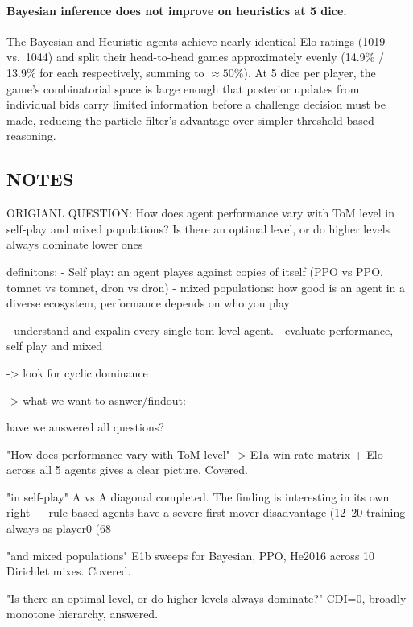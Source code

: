 \documentclass{article}
\begin{document}
  \paragraph{Bayesian inference does not improve on heuristics at 5 dice.}
  The Bayesian and Heuristic agents achieve nearly identical Elo ratings (1019
  vs.\ 1044) and split their head-to-head games approximately evenly (14.9\% /
  13.9\% for each respectively, summing to $\approx 50\%$). At 5 dice per player,
  the game's combinatorial space is large enough that posterior updates from
  individual bids carry limited information before a challenge decision must be
  made, reducing the particle filter's advantage over simpler threshold-based
  reasoning.



\subsection{NOTES}


ORIGIANL QUESTION: How does agent performance vary with ToM level in self-play and mixed populations? Is there an optimal
   level, or do higher levels always dominate lower ones

definitons:
- Self play: an agent playes against copies of itself 
(PPO vs PPO, tomnet vs tomnet, dron vs dron)
- mixed populations: how good is an agent in a diverse ecosystem, performance depends on who you play


- understand and expalin every single tom level agent. 
- evaluate performance, self play and mixed 

-> look for cyclic dominance

-> what we want to asnwer/findout: 


have we answered all questions?

  "How does performance vary with ToM level" 
 -> E1a win-rate matrix + Elo across all 5 agents gives a clear picture. Covered.

  "in self-play"  
  A vs A diagonal completed. The finding is interesting in its own right — rule-based agents have a severe first-mover disadvantage (12–20%
   training always as player0 (68%

  "and mixed populations" 
  E1b sweeps for Bayesian, PPO, He2016 across 10 Dirichlet mixes. Covered.

  "Is there an optimal level, or do higher levels always dominate?" 
  CDI=0, broadly monotone hierarchy, answered.
\end{document}
